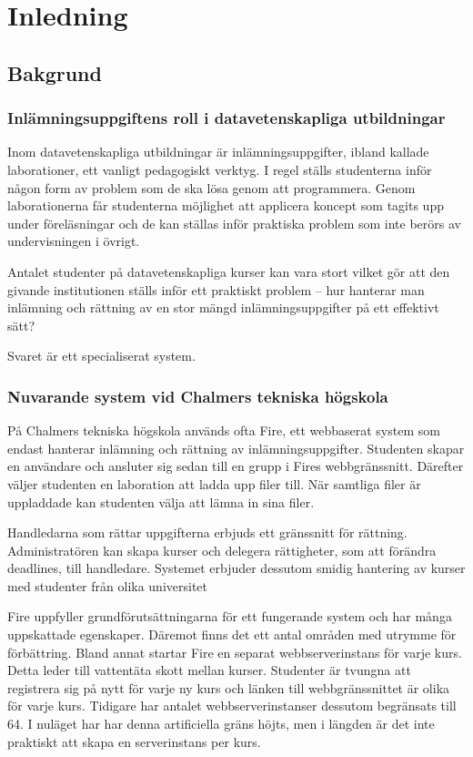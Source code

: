 \chapter{Inledning}

\section{Bakgrund}

\subsection{Inlämningsuppgiftens roll i datavetenskapliga utbildningar}

Inom datavetenskapliga utbildningar är inlämningsuppgifter, ibland kallade laborationer, ett vanligt pedagogiskt verktyg. I regel ställs studenterna inför någon form av problem som de ska lösa genom att programmera. Genom laborationerna får studenterna möjlighet att applicera koncept som tagits upp under föreläsningar och de kan ställas inför praktiska problem som inte berörs av undervisningen i övrigt. 

Antalet studenter på datavetenskapliga kurser kan vara stort vilket gör att den givande institutionen ställs inför ett praktiskt problem – hur hanterar man inlämning och rättning av en stor mängd inlämningsuppgifter på ett effektivt sätt?

Svaret är ett specialiserat system.

\subsection{Nuvarande system vid Chalmers tekniska högskola}

På Chalmers tekniska högskola används ofta Fire, ett webbaserat system som endast hanterar inlämning och rättning av inlämningsuppgifter.
Studenten skapar en användare och ansluter sig sedan till en grupp i Fires webbgränssnitt. Därefter väljer studenten en laboration att ladda upp filer till. När samtliga filer är uppladdade kan studenten välja att lämna in sina filer. 

Handledarna som rättar uppgifterna erbjuds ett gränssnitt för rättning. Administratören kan skapa kurser och delegera rättigheter, som att förändra deadlines, till handledare. Systemet erbjuder dessutom smidig hantering av kurser med studenter från olika universitet

Fire uppfyller grundförutsättningarna för ett fungerande system och har många uppskattade egenskaper.
Däremot finns det ett antal områden med utrymme för förbättring. Bland annat startar Fire en separat webbserverinstans för varje kurs. Detta leder till vattentäta skott mellan kurser. Studenter är tvungna att registrera sig på nytt för varje ny kurs och länken till webbgränssnittet är olika för varje kurs. Tidigare har antalet webbserverinstanser dessutom begränsats till 64. I nuläget har har denna artificiella gräns höjts, men i längden är det inte praktiskt att skapa en serverinstans per kurs.

